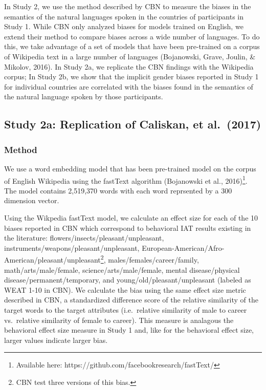 \documentclass[10pt, letterpaper]{article}
\begin{document}
In Study 2, we use the method described by CBN to measure the biases in
the semantics of the natural languages spoken in the countries of
participants in Study 1. While CBN only analyzed biases for models
trained on English, we extend their method to compare biases across a
wide number of languages. To do this, we take advantage of a set of
models that have been pre-trained on a corpus of Wikipedia text in a
large number of languages (Bojanowski, Grave, Joulin, \& Mikolov, 2016).
In Study 2a, we replicate the CBN findings with the Wikipedia corpus; In
Study 2b, we show that the implicit gender biases reported in Study 1
for individual countries are correlated with the biases found in the
semantics of the natural language spoken by those participants.

\subsection{Study 2a: Replication of Caliskan, et
al.~(2017)}\label{study-2a-replication-of-caliskan-et-al.2017}

\subsubsection{Method}\label{method-1}

We use a word embedding model that has been pre-trained model on the
corpus of English Wikipedia using the fastText algorithm (Bojanowski et
al.,
2016)\footnote{Available here: https://github.com/facebookresearch/fastText/}.
The model contains 2,519,370 words with each word reprsented by a 300
dimension vector.

Using the Wikpedia fastText model, we calculate an effect size for each
of the 10 biases reported in CBN which correspond to behavioral IAT
results existing in the literature: flowers/insects/pleasant/unpleasant,
instruments/weapons/pleasant/unpleasant,
European-American/Afro-American/pleasant/unpleasant\footnote{CBN test three versions of this bias.},
males/females/career/family, math/arts/male/female,
science/arts/male/female, mental disease/physical
disease/permanent/temporary, and young/old/pleasant/unpleasant (labeled
as WEAT 1-10 in CBN). We calculate the bias using the same effect size
metric described in CBN, a standardized difference score of the relative
similarity of the target words to the target attributes (i.e.~relative
similarity of male to career vs.~relative similarity of female to
career). This measure is analagous the behavioral effect size measure in
Study 1 and, like for the behavioral effect size, larger values indicate
larger bias.
\end{document}
